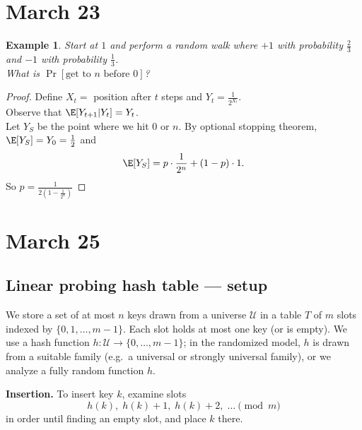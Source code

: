 \documentclass[a4paper]{article}
\newtheorem{eg}[thm]{Example}
\begin{document}
\section{March 23}
\begin{eg}
    Start at $1$ and perform a random walk where $+1$ with probability $\frac{2}{3}$ and $-1$ with probability $\frac{1}{3}$. \\
    What is $\Pr[ \text{get to $n$ before $0$}]$?
\end{eg}
\begin{proof}
    Define $X_t=$ position after $t$ steps and $Y_t=\frac{1}{2^{X_t}}$. \\
    Observe that $\E[Y_{t+1} | Y_{t}]=Y_t$. \\
    Let $Y_S$ be the point where we hit $0$ or $n$. By optional stopping theorem, $\E[Y_S]=Y_0=\frac{1}{2}$ and 
    \[
        \E[Y_S]=p \cdot \frac{1}{2^n}+(1-p)\cdot 1
    .\] 
    So $p=\frac{1}{2(1- \frac{1}{2^n})}$
\end{proof}
\newpage
\section{March 25}
\subsection{Linear probing hash table --- setup}
We store a set of at most $n$ keys drawn from a universe $\mathcal{U}$ in a table $T$ of $m$ slots indexed by $\{0,1,\ldots,m-1\}$. Each slot holds at most one key (or is empty). We use a hash function $h\colon \mathcal{U}\to \{0,\ldots,m-1\}$; in the randomized model, $h$ is drawn from a suitable family (e.g.\ a universal or strongly universal family), or we analyze a fully random function $h$.

\medskip
\noindent\textbf{Insertion.} To insert key $k$, examine slots
\[
h(k),\; h(k)+1,\; h(k)+2,\; \ldots \pmod m
\]
in order until finding an empty slot, and place $k$ there.
\end{document}
